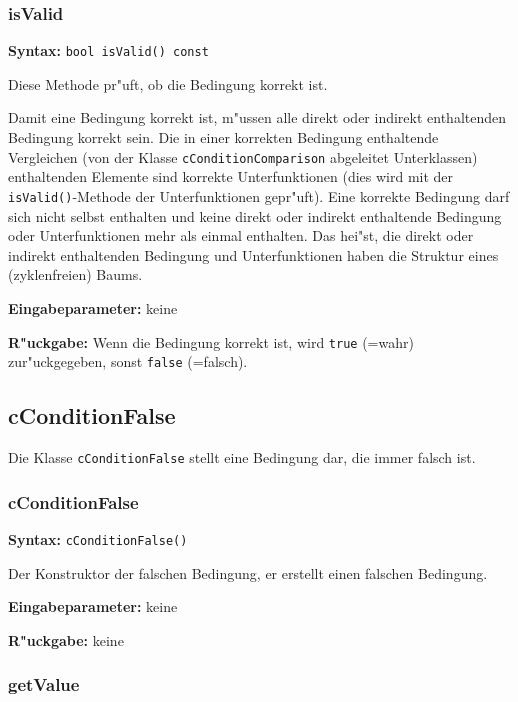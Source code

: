 \subsubsection{isValid}

\textbf{Syntax:} \verb|bool isValid() const|

\bigskip\noindent
Diese Methode pr"uft, ob die Bedingung korrekt ist.

Damit eine Bedingung korrekt ist, m"ussen alle direkt oder indirekt enthaltenden Bedingung korrekt sein.
Die in einer korrekten Bedingung enthaltende Vergleichen (von der Klasse \verb|cConditionComparison| abgeleitet Unterklassen) enthaltenden Elemente sind korrekte Unterfunktionen (dies wird mit der \verb|isValid()|-Methode der Unterfunktionen gepr"uft).
Eine korrekte Bedingung darf sich nicht selbst enthalten und keine direkt oder indirekt enthaltende Bedingung oder Unterfunktionen mehr als einmal enthalten. Das hei"st, die direkt oder indirekt enthaltenden Bedingung und Unterfunktionen haben die Struktur eines (zyklenfreien) Baums.

\bigskip\noindent
\textbf{Eingabeparameter:} keine

\bigskip\noindent
\textbf{R"uckgabe:} Wenn die Bedingung korrekt ist, wird \verb|true| (=wahr) zur"uckgegeben, sonst \verb|false| (=falsch).


\subsection{cConditionFalse}

Die Klasse \verb|cConditionFalse| stellt eine Bedingung dar, die immer falsch ist.

\subsubsection{cConditionFalse}

\textbf{Syntax:} \verb|cConditionFalse()|

\bigskip\noindent
Der Konstruktor der falschen Bedingung, er erstellt einen falschen Bedingung.

\bigskip\noindent
\textbf{Eingabeparameter:} keine

\bigskip\noindent
\textbf{R"uckgabe:} keine


\subsubsection{getValue}

